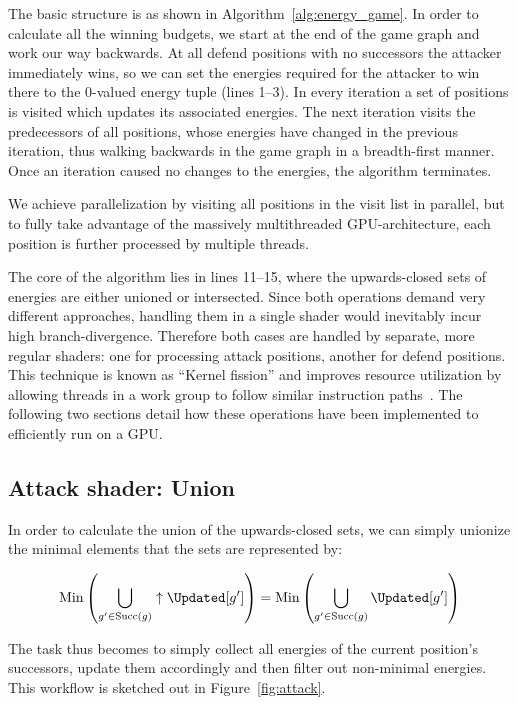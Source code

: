 The basic structure is as shown in Algorithm~\ref{alg:energy_game}.
In order to calculate all the winning budgets,
we start at the end of the game graph and work our way backwards.
At all defend positions with no successors the attacker immediately wins,
so we can set the energies required for the attacker to win there to the
0-valued energy tuple (lines 1--3).
In every iteration a set of positions is visited which updates its associated
energies.
The next iteration visits the predecessors of all positions, whose energies
have changed in the previous iteration, thus walking backwards in the game
graph in a breadth-first manner. Once an iteration caused no changes to the
energies, the algorithm terminates.

We achieve parallelization by visiting all positions in the visit list in
parallel, but to fully take advantage of the massively multithreaded
GPU-architecture, each position is further processed by multiple threads.

The core of the algorithm lies in lines 11--15, where the upwards-closed sets of
energies are either unioned or intersected.
Since both operations demand very different approaches,
handling them in a single shader would inevitably incur high branch-divergence.
Therefore both cases are handled by separate, more regular shaders:
one for processing attack positions, another for defend positions.
This technique is known as \enquote{Kernel fission}
and improves resource utilization by allowing threads in a work group to follow
similar instruction paths~\cite{Hijma2023}.
The following two sections detail how these operations have been implemented to
efficiently run on a GPU\@.


\subsection{Attack shader: Union}

In order to calculate the union of the upwards-closed sets,
we can simply unionize the minimal elements that the sets are represented by:

\[\mathrm{Min} \left( \bigcup_{g' \in \mathrm{Succ}(g)} \uparrow \Updated[g'] \right) =
  \mathrm{Min} \left( \bigcup_{g' \in \mathrm{Succ}(g)}          \Updated[g'] \right)\]

The task thus becomes to simply
collect all energies of the current position's successors,
update them accordingly
and then filter out non-minimal energies.
This workflow is sketched out in Figure~\ref{fig:attack}.

